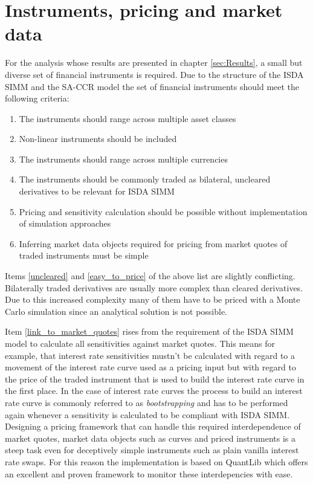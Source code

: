 \documentclass[../Thesis_AHoecherl.tex]{subfiles}
\begin{document}
    \section{Instruments, pricing and market data}\label{Instruments, pricing and market data}
    For the analysis whose results are presented in chapter \ref{sec:Results}, a small but diverse set of financial instruments is required. Due to the structure of the \gls{ISDA SIMM} and the \gls{SA-CCR} model the set of financial instruments should meet the following criteria:

    \begin{enumerate}
        \item The instruments should range across multiple asset classes
        \item Non-linear instruments should be included
        \item The instruments should range across multiple currencies
        \item The instruments should be commonly traded as bilateral, uncleared derivatives to be relevant for \gls{ISDA SIMM} \label{uncleared}
        \item Pricing and sensitivity calculation should be possible without implementation of simulation approaches \label{easy_to_price}
        \item Inferring market data objects required for pricing from market quotes of traded instruments must be simple \label{link_to_market_quotes}   
    \end{enumerate}
    
    Items \ref{uncleared} and \ref{easy_to_price} of the above list are slightly conflicting. Bilaterally traded derivatives are usually more complex than cleared derivatives. Due to this increased complexity many of them have to be priced with a Monte Carlo simulation since an analytical solution is not possible.

    Item \ref{link_to_market_quotes} rises from the requirement of the \gls{ISDA SIMM} model to calculate all sensitivities against market quotes. This means for example, that interest rate sensitivities mustn't be calculated with regard to a movement of the interest rate curve used as a pricing input but with regard to the price of the traded instrument that is used to build the interest rate curve in the first place. In the case of interest rate curves the process to build an interest rate curve is commonly referred to as \emph{bootstrapping} and has to be performed again whenever a sensitivity is calculated to be compliant with \gls{ISDA SIMM}. Designing a pricing framework that can handle this required interdependence of market quotes, market data objects such as curves and priced instruments is a steep task even for deceptively simple instruments such as plain vanilla interest rate swaps. For this reason the implementation is based on QuantLib \cite{QuantLib} which offers an excellent and proven framework to monitor these interdepencies with ease.
\end{document}
